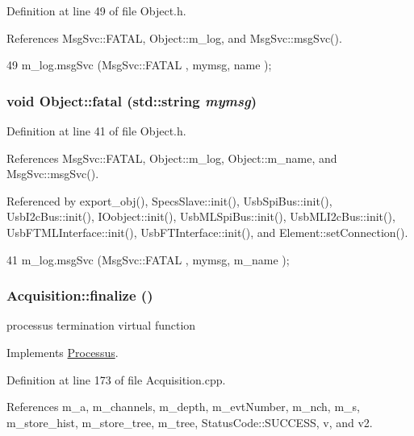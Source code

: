 Definition at line 49 of file Object.h.

References MsgSvc::FATAL, Object::m\_\-log, and MsgSvc::msgSvc().


\begin{DoxyCode}
49 { m_log.msgSvc (MsgSvc::FATAL   , mymsg, name ); }
\end{DoxyCode}
\hypertarget{classObject_aad5a16aac7516ce65bd5ec02ab07fc80}{
\subsubsection[{fatal}]{\setlength{\rightskip}{0pt plus 5cm}void Object::fatal (std::string {\em mymsg})}}
\label{classObject_aad5a16aac7516ce65bd5ec02ab07fc80}


Definition at line 41 of file Object.h.

References MsgSvc::FATAL, Object::m\_\-log, Object::m\_\-name, and MsgSvc::msgSvc().

Referenced by export\_\-obj(), SpecsSlave::init(), UsbSpiBus::init(), UsbI2cBus::init(), IOobject::init(), UsbMLSpiBus::init(), UsbMLI2cBus::init(), UsbFTMLInterface::init(), UsbFTInterface::init(), and Element::setConnection().


\begin{DoxyCode}
41 { m_log.msgSvc (MsgSvc::FATAL   , mymsg, m_name ); }
\end{DoxyCode}
\hypertarget{classAcquisition_ab8ffcd86548280f0403b3ae6338f2499}{
\subsubsection[{finalize}]{ Acquisition::finalize ()}}
\label{classAcquisition_ab8ffcd86548280f0403b3ae6338f2499}
processus termination virtual function 

Implements \hyperlink{classProcessus_aba93d691f031bdb18ae4b8afb1b2e856}{Processus}.

Definition at line 173 of file Acquisition.cpp.

References m\_\-a, m\_\-channels, m\_\-depth, m\_\-evtNumber, m\_\-nch, m\_\-s, m\_\-store\_\-hist, m\_\-store\_\-tree, m\_\-tree, StatusCode::SUCCESS, v, and v2.

